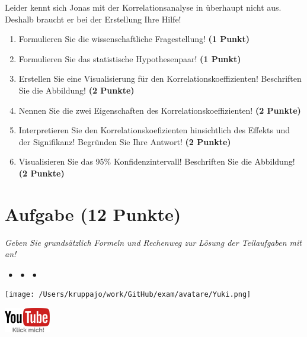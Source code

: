 \documentclass[a4paper, 9pt]{scrartcl}\usepackage[]{graphicx}\usepackage[]{xcolor}
\begin{document}
Leider kennt sich Jonas mit der Korrelationsanalyse in \Rlogo überhaupt nicht aus. Deshalb braucht er bei der Erstellung Ihre Hilfe!

\begin{enumerate}
  \item Formulieren Sie die wissenschaftliche Fragestellung! \textbf{(1 Punkt)}
  \item Formulieren Sie das statistische Hypothesenpaar! \textbf{(1 Punkt)}
\item Erstellen Sie eine Visualisierung für den Korrelationskoeffizienten! Beschriften Sie die Abbildung! \textbf{(2 Punkte)}
\item Nennen Sie die zwei Eigenschaften des Korrelationskoeffizienten! \textbf{(2 Punkte)}
\item Interpretieren Sie den Korrelationskoefizienten hinsichtlich des
  Effekts und der Signifikanz! Begründen Sie Ihre Antwort! \textbf{(2 Punkte)}
\item Visualisieren Sie das 95\% Konfidenzintervall! Beschriften Sie die Abbildung! \textbf{(2 Punkte)} 
\end{enumerate} 
\clearpage

\section{Aufgabe \hfill (12 Punkte)}

\textit{Geben Sie grundsätzlich Formeln und Rechenweg zur Lösung der Teilaufgaben mit an!} \\[1Ex]
 

 
\ifcollection
\begin{flushright}
\tiny\vspace{-3Ex}
\textbf{\examinhaltstart}
\exammodulestat $\;\bullet$
\exammodulestatbbv $\;\bullet$
\exammodulestatversuch $\;\bullet$
\exammodulebiostat
\vspace{-4Ex}
\end{flushright}
\begin{minipage}[t]{0.5\textwidth}
\texttt{[image: /Users/kruppajo/work/GitHub/exam/avatare/Yuki.png]}
\end{minipage}
\begin{minipage}[t]{0.5\textwidth}
\hfill
\href{https://youtu.be/fB6nF4dxodA}{\includegraphics[width = 2cm]{img/youtube}}
\end{minipage}
\vspace{-3ex}
\fi
\end{document}
